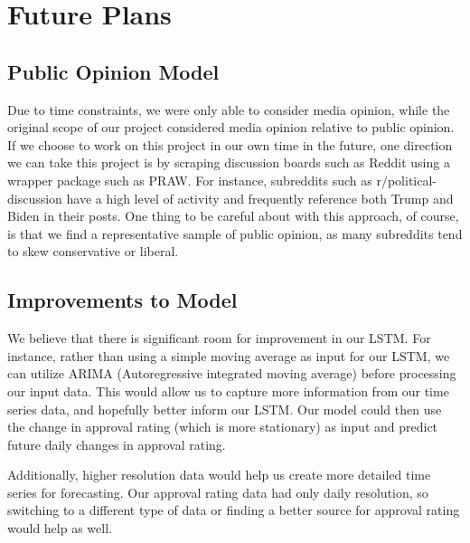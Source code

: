 \documentclass[12pt, letter-paper]{article}
\begin{document}
\section{Future Plans}

\subsection{Public Opinion Model}

Due to time constraints, we were only able to consider media opinion, while the original scope of our project considered media opinion relative to public opinion. If we choose to work on this project in our own time in the future, one direction we can take this project is by scraping discussion boards such as Reddit using a wrapper package such as PRAW. For instance, subreddits such as r/political-discussion have a high level of activity and frequently reference both Trump and Biden in their posts. One thing to be careful about with this approach, of course, is that we find a representative sample of public opinion, as many subreddits tend to skew conservative or liberal.

\subsection{Improvements to Model}

We believe that there is significant room for improvement in our LSTM. For instance, rather than using a simple moving average as input for our LSTM, we can utilize ARIMA (Autoregressive integrated moving average) before processing our input data. This would allow us to capture more information from our time series data, and hopefully better inform our LSTM. Our model could then use the change in approval rating (which is more stationary) as input and predict future daily changes in approval rating.

Additionally, higher resolution data would help us create more detailed time series for forecasting. Our approval rating data had only daily resolution, so switching to a different type of data or finding a better source for approval rating would help as well.
\end{document}
